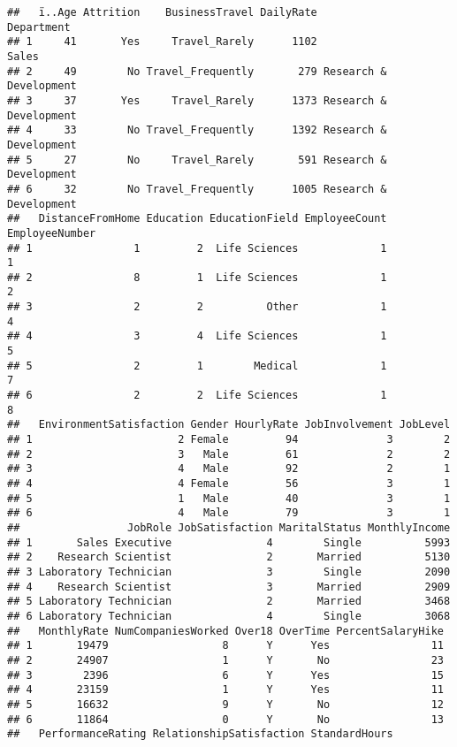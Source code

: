 \documentclass[]{article}
\begin{document}
\begin{verbatim}
##   ï..Age Attrition    BusinessTravel DailyRate             Department
## 1     41       Yes     Travel_Rarely      1102                  Sales
## 2     49        No Travel_Frequently       279 Research & Development
## 3     37       Yes     Travel_Rarely      1373 Research & Development
## 4     33        No Travel_Frequently      1392 Research & Development
## 5     27        No     Travel_Rarely       591 Research & Development
## 6     32        No Travel_Frequently      1005 Research & Development
##   DistanceFromHome Education EducationField EmployeeCount EmployeeNumber
## 1                1         2  Life Sciences             1              1
## 2                8         1  Life Sciences             1              2
## 3                2         2          Other             1              4
## 4                3         4  Life Sciences             1              5
## 5                2         1        Medical             1              7
## 6                2         2  Life Sciences             1              8
##   EnvironmentSatisfaction Gender HourlyRate JobInvolvement JobLevel
## 1                       2 Female         94              3        2
## 2                       3   Male         61              2        2
## 3                       4   Male         92              2        1
## 4                       4 Female         56              3        1
## 5                       1   Male         40              3        1
## 6                       4   Male         79              3        1
##                 JobRole JobSatisfaction MaritalStatus MonthlyIncome
## 1       Sales Executive               4        Single          5993
## 2    Research Scientist               2       Married          5130
## 3 Laboratory Technician               3        Single          2090
## 4    Research Scientist               3       Married          2909
## 5 Laboratory Technician               2       Married          3468
## 6 Laboratory Technician               4        Single          3068
##   MonthlyRate NumCompaniesWorked Over18 OverTime PercentSalaryHike
## 1       19479                  8      Y      Yes                11
## 2       24907                  1      Y       No                23
## 3        2396                  6      Y      Yes                15
## 4       23159                  1      Y      Yes                11
## 5       16632                  9      Y       No                12
## 6       11864                  0      Y       No                13
##   PerformanceRating RelationshipSatisfaction StandardHours

\end{verbatim}
\end{document}
